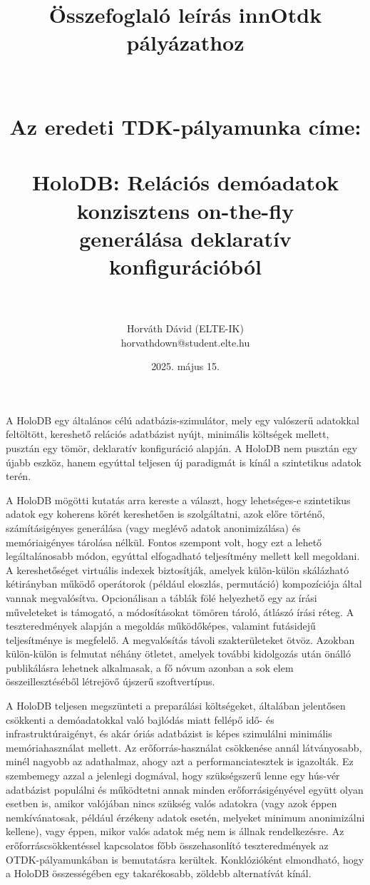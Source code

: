 \documentclass[12pt]{article}
\title{Összefoglaló leírás innOtdk pályázathoz \\ ~ \\ ~ \\ {\Large Az eredeti TDK-pályamunka címe: \\ ~ \\ HoloDB: Relációs demóadatok konzisztens on-the-fly \\ generálása deklaratív konfigurációból} \\ ~}
\author{Horváth Dávid (ELTE-IK) \\ horvathdown@student.elte.hu}
\date{2025. május 15.}
\begin{document}
\begin{titlepage}
\maketitle
\thispagestyle{empty}
\end{titlepage}

\cleardoublepage

A HoloDB egy általános célú adatbázis-szimulátor, mely egy valószerű adatokkal feltöltött, kereshető relációs adatbázist nyújt, minimális költségek mellett,
pusztán egy tömör, deklaratív konfiguráció alapján.
A HoloDB nem pusztán egy újabb eszköz, hanem egyúttal teljesen új paradigmát is kínál a szintetikus adatok terén.

A HoloDB mögötti kutatás arra kereste a választ, hogy lehetséges-e szintetikus adatok egy koherens körét kereshetően is szolgáltatni, azok előre történő, számításigényes generálása (vagy meglévő adatok anonimizálása) és memóriaigényes tárolása nélkül.
Fontos szempont volt, hogy ezt a lehető legáltalánosabb módon, egyúttal elfogadható teljesítmény mellett kell megoldani.
A kereshetőséget virtuális indexek biztosítják, amelyek külön-külön skálázható kétirányban működő operátorok (például eloszlás, permutáció) kompozíciója által vannak megvalósítva.
Opcionálisan a táblák fölé helyezhető egy az írási műveleteket is támogató, a módosításokat tömören tároló, átlászó írási réteg.
A teszteredmények alapján a megoldás működőképes, valamint futásidejű teljesítménye is megfelelő.
A megvalósítás távoli szakterületeket ötvöz. Azokban külön-külön is felmutat néhány ötletet, amelyek további kidolgozás után önálló publikálásra lehetnek alkalmasak, a fő nóvum azonban a sok elem összeillesztéséből létrejövő újszerű szoftvertípus.

A HoloDB teljesen megszünteti a preparálási költségeket, általában jelentősen csökkenti a demóadatokkal való bajlódás miatt fellépő idő- és infrastruktúraigényt, és akár óriás adatbázist is képes szimulálni minimális memóriahasználat mellett.
Az erőforrás-használat csökkenése annál látványosabb, minél nagyobb az adathalmaz, ahogy azt a performanciatesztek is igazolták.
Ez szembemegy azzal a jelenlegi dogmával, hogy szükségszerű lenne egy hús-vér adatbázist populálni és működtetni annak minden erőforrásigényével együtt olyan esetben is, amikor valójában nincs szükség valós adatokra (vagy azok éppen nemkívánatosak, például érzékeny adatok esetén, melyeket minimum anonimizálni kellene),
vagy éppen, mikor valós adatok még nem is állnak rendelkezésre.
Az erőforráscsökkentéssel kapcsolatos főbb összehasonlító teszteredmények az OTDK-pályamunkában is bemutatásra kerültek.
Konklózióként elmondható, hogy a HoloDB összességében egy takarékosabb, zöldebb alternatívát kínál.
\end{document}

